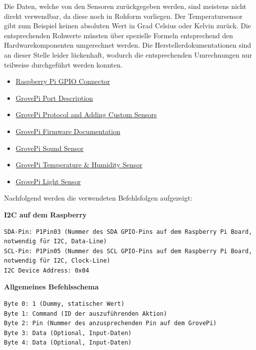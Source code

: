 Die Daten, welche von den Sensoren zurückgegeben werden, sind meistens nicht direkt verwendbar, da diese noch in Rohform vorliegen. Der Temperatursensor gibt zum Beispiel keinen absoluten Wert in Grad Celsius oder Kelvin zurück. Die entsprechenden Rohwerte müssten über spezielle Formeln entsprechend den Hardwarekomponenten umgerechnet werden. Die Herstellerdokumentationen sind an dieser Stelle leider lückenhaft, wodurch die entsprechenden Umrechnungen nur teilweise durchgeführt werden konnten.

\begin{itemize}
\item \hyperlink{https://learn.adafruit.com/adafruits-raspberry-pi-lesson-4-gpio-setup/the-gpio-connector}{Raspberry Pi GPIO Connector}
\item \hyperlink{http://www.dexterindustries.com/GrovePi/engineering/port-description/}{GrovePi Port Description}
\item \hyperlink{http://www.dexterindustries.com/GrovePi/programming/grovepi-protocol-adding-custom-sensors/}{GrovePi Protocol and Adding Custom Sensors}
\item \hyperlink{https://github.com/DexterInd/GrovePi/blob/bfcaa57bb6ce2b5c4cb0057569ea38f3574f24cf/Firmware/Source/v1.2/grove_pi_v1_2_6/README.md}{GrovePi Firmware Documentation}
\item \hyperlink{http://www.seeedstudio.com/wiki/Grove_-_Sound_Sensor}{GrovePi Sound Sensor}
\item \hyperlink{http://www.seeedstudio.com/wiki/Grove_-_Temperature_and_Humidity_Sensor}{GrovePi Temperature \& Humidity Sensor}
\item \hyperlink{http://www.seeedstudio.com/wiki/Grove_-_Light_Sensor}{GrovePi Light Sensor}
\end{itemize}


Nachfolgend werden die verwendeten Befehlsfolgen aufgezeigt:

\textbf{I2C auf dem Raspberry}
\begin{lstlisting}
SDA-Pin: P1Pin03 (Nummer des SDA GPIO-Pins auf dem Raspberry Pi Board, notwendig für I2C, Data-Line)
SCL-Pin: P1Pin05 (Nummer des SCL GPIO-Pins auf dem Raspberry Pi Board, notwendig für I2C, Clock-Line)
I2C Device Address: 0x04
\end{lstlisting}

\textbf{Allgemeines Befehlsschema}
\begin{lstlisting}
Byte 0: 1 (Dummy, statischer Wert)
Byte 1: Command (ID der auszuführenden Aktion)
Byte 2: Pin (Nummer des anzusprechenden Pin auf dem GrovePi)
Byte 3: Data (Optional, Input-Daten)
Byte 4: Data (Optional, Input-Daten)
\end{lstlisting}

